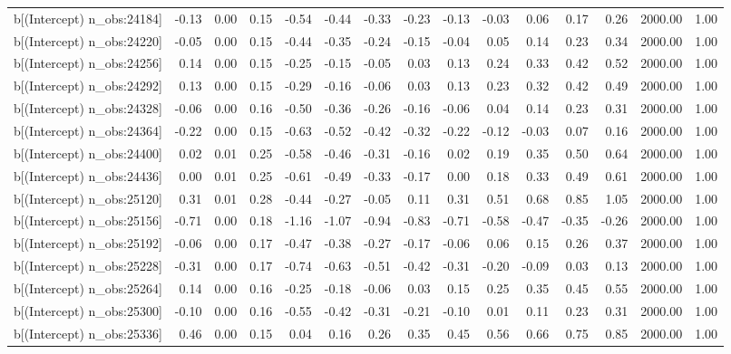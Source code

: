 \begin{table}[ht]
\begin{tabular}{rrrrrrrrrrrrrrr}
  b[(Intercept) n\_obs:24184] & -0.13 & 0.00 & 0.15 & -0.54 & -0.44 & -0.33 & -0.23 & -0.13 & -0.03 & 0.06 & 0.17 & 0.26 & 2000.00 & 1.00 \\ 
  b[(Intercept) n\_obs:24220] & -0.05 & 0.00 & 0.15 & -0.44 & -0.35 & -0.24 & -0.15 & -0.04 & 0.05 & 0.14 & 0.23 & 0.34 & 2000.00 & 1.00 \\ 
  b[(Intercept) n\_obs:24256] & 0.14 & 0.00 & 0.15 & -0.25 & -0.15 & -0.05 & 0.03 & 0.13 & 0.24 & 0.33 & 0.42 & 0.52 & 2000.00 & 1.00 \\ 
  b[(Intercept) n\_obs:24292] & 0.13 & 0.00 & 0.15 & -0.29 & -0.16 & -0.06 & 0.03 & 0.13 & 0.23 & 0.32 & 0.42 & 0.49 & 2000.00 & 1.00 \\ 
  b[(Intercept) n\_obs:24328] & -0.06 & 0.00 & 0.16 & -0.50 & -0.36 & -0.26 & -0.16 & -0.06 & 0.04 & 0.14 & 0.23 & 0.31 & 2000.00 & 1.00 \\ 
  b[(Intercept) n\_obs:24364] & -0.22 & 0.00 & 0.15 & -0.63 & -0.52 & -0.42 & -0.32 & -0.22 & -0.12 & -0.03 & 0.07 & 0.16 & 2000.00 & 1.00 \\ 
  b[(Intercept) n\_obs:24400] & 0.02 & 0.01 & 0.25 & -0.58 & -0.46 & -0.31 & -0.16 & 0.02 & 0.19 & 0.35 & 0.50 & 0.64 & 2000.00 & 1.00 \\ 
  b[(Intercept) n\_obs:24436] & 0.00 & 0.01 & 0.25 & -0.61 & -0.49 & -0.33 & -0.17 & 0.00 & 0.18 & 0.33 & 0.49 & 0.61 & 2000.00 & 1.00 \\ 
  b[(Intercept) n\_obs:25120] & 0.31 & 0.01 & 0.28 & -0.44 & -0.27 & -0.05 & 0.11 & 0.31 & 0.51 & 0.68 & 0.85 & 1.05 & 2000.00 & 1.00 \\ 
  b[(Intercept) n\_obs:25156] & -0.71 & 0.00 & 0.18 & -1.16 & -1.07 & -0.94 & -0.83 & -0.71 & -0.58 & -0.47 & -0.35 & -0.26 & 2000.00 & 1.00 \\ 
  b[(Intercept) n\_obs:25192] & -0.06 & 0.00 & 0.17 & -0.47 & -0.38 & -0.27 & -0.17 & -0.06 & 0.06 & 0.15 & 0.26 & 0.37 & 2000.00 & 1.00 \\ 
  b[(Intercept) n\_obs:25228] & -0.31 & 0.00 & 0.17 & -0.74 & -0.63 & -0.51 & -0.42 & -0.31 & -0.20 & -0.09 & 0.03 & 0.13 & 2000.00 & 1.00 \\ 
  b[(Intercept) n\_obs:25264] & 0.14 & 0.00 & 0.16 & -0.25 & -0.18 & -0.06 & 0.03 & 0.15 & 0.25 & 0.35 & 0.45 & 0.55 & 2000.00 & 1.00 \\ 
  b[(Intercept) n\_obs:25300] & -0.10 & 0.00 & 0.16 & -0.55 & -0.42 & -0.31 & -0.21 & -0.10 & 0.01 & 0.11 & 0.23 & 0.31 & 2000.00 & 1.00 \\ 
  b[(Intercept) n\_obs:25336] & 0.46 & 0.00 & 0.15 & 0.04 & 0.16 & 0.26 & 0.35 & 0.45 & 0.56 & 0.66 & 0.75 & 0.85 & 2000.00 & 1.00 \\ 

\end{tabular}
\end{table}
